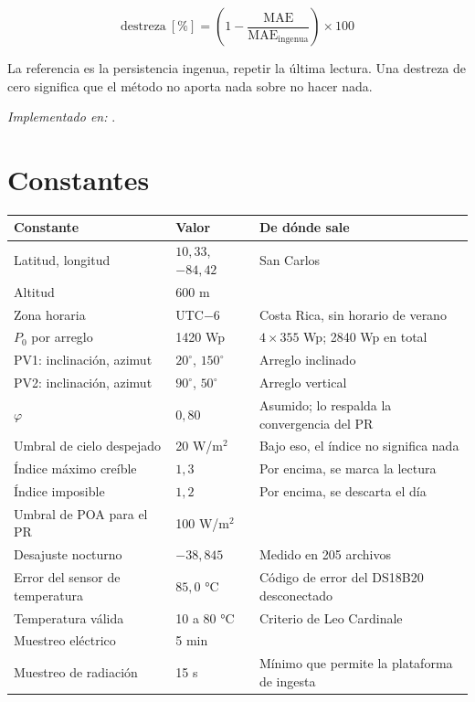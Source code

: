 \documentclass[11pt,a4paper]{article}
\begin{document}
\begin{equation*}
  \text{destreza}\ [\%] = \left(1 - \frac{\mathrm{MAE}}{\mathrm{MAE_{ingenua}}}\right) \times 100
\end{equation*}

La referencia es la persistencia ingenua, repetir la última lectura. Una destreza de cero
significa que el método no aporta nada sobre no hacer nada.

\emph{Implementado en:} .

\section{Constantes}

\begin{center}
\small
\begin{tabular}{@{}p{40mm}p{30mm}p{68mm}@{}}
\toprule
\textbf{Constante} & \textbf{Valor} & \textbf{De dónde sale} \\
\midrule
Latitud, longitud & $10{,}33$, $-84{,}42$ & San Carlos \\
Altitud & 600 m & \\
Zona horaria & UTC$-6$ & Costa Rica, sin horario de verano \\
$P_0$ por arreglo & 1420 Wp & $4 \times 355$ Wp; 2840 Wp en total \\
PV1: inclinación, azimut & $20^\circ$, $150^\circ$ & Arreglo inclinado \\
PV2: inclinación, azimut & $90^\circ$, $50^\circ$ & Arreglo vertical \\
$\varphi$ & $0{,}80$ & Asumido; lo respalda la convergencia del PR \\
Umbral de cielo despejado & 20 W/m$^2$ & Bajo eso, el índice no significa nada \\
Índice máximo creíble & $1{,}3$ & Por encima, se marca la lectura \\
Índice imposible & $1{,}2$ & Por encima, se descarta el día \\
Umbral de POA para el PR & 100 W/m$^2$ & \\
Desajuste nocturno & $-38{,}845$ & Medido en 205 archivos \\
Error del sensor de temperatura & $85{,}0$ °C & Código de error del DS18B20 desconectado \\
Temperatura válida & 10 a 80 °C & Criterio de Leo Cardinale \\
Muestreo eléctrico & 5 min & \\
Muestreo de radiación & 15 s & Mínimo que permite la plataforma de ingesta \\
\bottomrule
\end{tabular}
\end{center}
\end{document}
